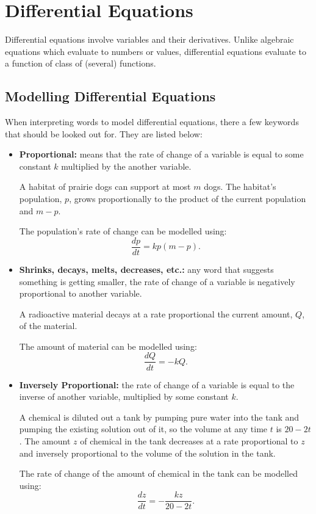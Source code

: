 \section{Differential Equations}
Differential equations involve variables and their derivatives. Unlike algebraic equations which evaluate to numbers or values, differential equations evaluate to a function of class of (several) functions.

\subsection{Modelling Differential Equations}
When interpreting words to model differential equations, there a few keywords that should be looked out for. They are listed below:
\begin{itemize}
	\item \textbf{Proportional:} means that the rate of change of a variable is equal to some constant $k$ multiplied by the another variable.

	A habitat of prairie dogs can support at most $m$ dogs. The habitat's population, $p$, grows proportionally to the product of the current population and $m - p$.

	The population's rate of change can be modelled using:
	\[ \frac{dp}{dt} = kp(m - p). \]

	\item \textbf{Shrinks, decays, melts, decreases, etc.:} any word that suggests something is getting smaller, the rate of change of a variable is negatively proportional to another variable.

	A radioactive material decays at a rate proportional the current amount, $Q$, of the material.

	The amount of material can be modelled using:
	\[ \frac{dQ}{dt} = -kQ. \]

	\item \textbf{Inversely Proportional:} the rate of change of a variable is equal to the inverse of another variable, multiplied by some constant $k$.

	A chemical is diluted out a tank by pumping pure water into the tank and pumping the existing solution out of it, so the volume at any time $t$ is $20 - 2t$. The amount $z$ of chemical in the tank decreases at a rate proportional to $z$ and inversely proportional to the volume of the solution in the tank.

	The rate of change of the amount of chemical in the tank can be modelled using:
	\[ \frac{dz}{dt} = -\frac{kz}{20 - 2t}. \]


\end{itemize}

